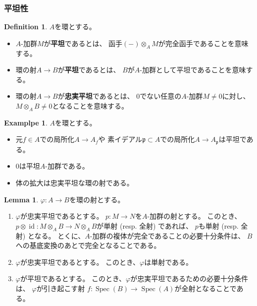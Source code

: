 \documentclass[uplatex]{jsarticle}
\theoremstyle{definition}
\newtheorem{lem}[lem]{Lemma}
\newtheorem{defi}[defi]{Definition}
\newtheorem{exam}[exam]{Examplpe}
\DeclareMathOperator{\id}{\mathrm{id}}
\DeclareMathOperator{\Spec}{\mathrm{Spec}}
\newcommand{\mfp}{\mathfrak{p}}
\begin{document}
\subsubsection{平坦性}


\begin{defi}
  \(A\)を環とする。
  \begin{itemize}
    \item \(A\)-加群\(M\)が\textbf{平坦}であるとは、
    函手\((-)\otimes_A M\)が完全函手であることを意味する。
    \item 環の射\(A\to B\)が\textbf{平坦}であるとは、
    \(B\)が\(A\)-加群として平坦であることを意味する。
    \item 環の射\(A\to B\)が\textbf{忠実平坦}であるとは、
    \(0\)でない任意の\(A\)-加群\(M\neq 0\)に対し、
    \(M\otimes_AB \neq 0\)となることを意味する。
  \end{itemize}
\end{defi}


\begin{exam}
  \(A\)を環とする。
  \begin{itemize}
    \item
    元\(f\in A\)での局所化\(A\to A_f\)や
    素イデアル\(\mfp\subset A\)での局所化\(A\to A_{\mfp}\)は平坦である。
    \item
    \(0\)は平坦\(A\)-加群である。
    \item
    体の拡大は忠実平坦な環の射である。
  \end{itemize}
\end{exam}





\begin{lem}\label{lem: ff kihon}
  \(\varphi:A\to B\)を環の射とする。
  \begin{enumerate}
    \item \label{enumi: ff0}
    \(\varphi\)が忠実平坦であるとする。
    \(p:M\to N\)を\(A\)-加群の射とする。
    このとき、\(p\otimes \id: M\otimes_A B \to N\otimes_A B\)が単射 (resp. 全射) であれば、
    \(p\)も単射 (resp. 全射) となる。
    とくに、\(A\)-加群の複体が完全であることの必要十分条件は、
    \(B\)への基底変換のあとで完全となることである。
    \item \label{enumi: ff1}
    \(\varphi\)が忠実平坦であるとする。
    このとき、\(\varphi\)は単射である。
    \item \label{enumi: ff2}
    \(\varphi\)が平坦であるとする。
    このとき、\(\varphi\)が忠実平坦であるための必要十分条件は、
    \(\varphi\)が引き起こす射
    \(f:\Spec(B)\to \Spec(A)\)が全射となることである。
  \end{enumerate}
\end{lem}
\end{document}
